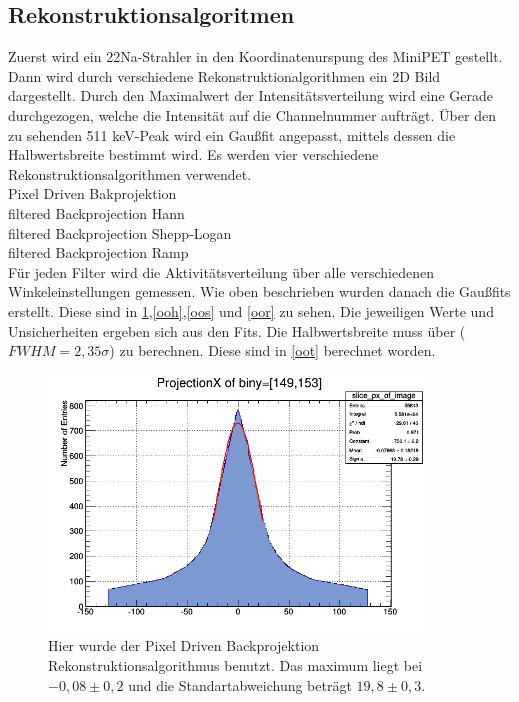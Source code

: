 \subsection{Rekonstruktionsalgoritmen}
Zuerst wird ein 22Na-Strahler in den Koordinatenurspung des MiniPET gestellt. Dann wird durch verschiedene Rekonstruktionalgorithmen ein 2D Bild dargestellt. Durch den Maximalwert der Intensitätsverteilung wird eine Gerade durchgezogen, welche die Intensität auf die Channelnummer aufträgt. Über den zu sehenden 511 keV-Peak wird ein Gaußfit angepasst, mittels dessen die Halbwertsbreite bestimmt wird.
Es werden vier verschiedene Rekonstruktionsalgorithmen verwendet. \\
Pixel Driven Bakprojektion \\
filtered Backprojection Hann \\
filtered Backprojection Shepp-Logan \\ 
filtered Backprojection Ramp \\
Für jeden Filter wird die Aktivitätsverteilung über alle verschiedenen Winkeleinstellungen gemessen. Wie oben beschrieben wurden danach die Gaußfits erstellt.
Diese sind in \cref{ooo},\cref{ooh},\cref{oos} und \cref{oor} zu sehen. Die jeweiligen Werte und Unsicherheiten ergeben sich aus den Fits. Die Halbwertsbreite muss über ($FWHM = 2,35\sigma$) zu berechnen. Diese sind in \cref{oot} berechnet worden.
\begin{figure}[h!]
	\centering
	\includegraphics[width=0.9\textwidth]{Ohne-Filter.png}
	\caption{Hier wurde der Pixel Driven Backprojektion Rekonstruktionsalgorithmus benutzt. Das maximum liegt bei $-0,08 \pm 0,2$ und die Standartabweichung beträgt $19,8 \pm 0,3$.}
	\label{ooo}
\end{figure}
